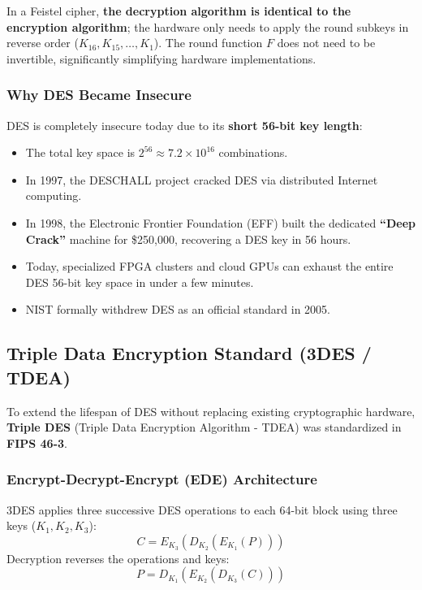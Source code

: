 \begin{tcolorbox}[colback=blue!5!white,colframe=blue!60!black,title=\textbf{Examination Invariant: The Feistel Symmetry Advantage}]
In a Feistel cipher, \textbf{the decryption algorithm is identical to the encryption algorithm}; the hardware only needs to apply the round subkeys in reverse order ($K_{16}, K_{15}, \dots, K_1$). The round function $F$ does not need to be invertible, significantly simplifying hardware implementations.
\end{tcolorbox}

\subsubsection{Why DES Became Insecure}

DES is completely insecure today due to its \textbf{short 56-bit key length}:
\begin{itemize}
\item The total key space is $2^{56} \approx 7.2 \times 10^{16}$ combinations.
\item In 1997, the DESCHALL project cracked DES via distributed Internet computing.
\item In 1998, the Electronic Frontier Foundation (EFF) built the dedicated \textbf{``Deep Crack''} machine for \$250,000, recovering a DES key in 56 hours.
\item Today, specialized FPGA clusters and cloud GPUs can exhaust the entire DES 56-bit key space in under a few minutes.
\item NIST formally withdrew DES as an official standard in 2005.
\end{itemize}

\subsection{Triple Data Encryption Standard (3DES / TDEA)}

To extend the lifespan of DES without replacing existing cryptographic hardware, \textbf{Triple DES} (Triple Data Encryption Algorithm - TDEA) was standardized in \textbf{FIPS 46-3}.

\subsubsection{Encrypt-Decrypt-Encrypt (EDE) Architecture}

3DES applies three successive DES operations to each 64-bit block using three keys ($K_1, K_2, K_3$):
\[ C = E_{K_3}\left( D_{K_2}\left( E_{K_1}(P) \right) \right) \]
Decryption reverses the operations and keys:
\[ P = D_{K_1}\left( E_{K_2}\left( D_{K_3}(C) \right) \right) \]

